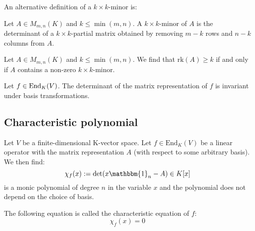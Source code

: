         An alternative definition of a $k\times k$-minor is: 
        \begin{definition}
		Let $A\in M_{m,n}(K)$ and $k\leq\min(m, n)$. A $k\times k$-minor of $A$ is the determinant of a $k\times k$-partial matrix obtained by removing $m-k$ rows and $n-k$ columns from $A$.
	\end{definition}
        \begin{theorem}
		Let $A\in M_{m,n}(K)$ and $k\leq\min(m, n)$. We find that $\text{rk}(A)\geq k$ if and only if $A$ contains a non-zero $k\times k$-minor.
	\end{theorem}
        
        \begin{theorem}
		Let $f\in\textup{End}_K(V)$. The determinant of the matrix representation of $f$ is invariant under basis transformations.
	\end{theorem}
	

\subsection{Characteristic polynomial}

    	\begin{definition}\label{linalgebra:characteristic_polynomial}
		Let $V$ be a finite-dimensional K-vector space. Let $f\in \text{End}_K(V)$ be a linear operator with the matrix representation $A$ (with respect to some arbitrary basis). We then find:
		\begin{equation}
                	\chi_f(x) := \det(x\mathbbm{1}_n - A) \in K[x]
		\end{equation}
		is a monic polynomial of degree $n$ in the variable $x$ and the polynomial does not depend on the choice of basis.
	\end{definition}
        
        \begin{definition}
		The following equation is called the characteristic equation of $f$:
	        \begin{equation}
            		\label{linalgebra:characteristic_equation}
			\boxed{\chi_f(x) = 0}
		\end{equation}
	\end{definition}
        
